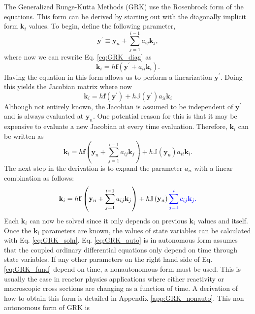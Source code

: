 \documentclass{ansconf}
\numberwithin{equation}{section}
\begin{document}
The Generalized Runge-Kutta Methods (GRK) use the Rosenbrock form of the equations. This form can be derived by starting out with the diagonally implicit form $\mathbf{k}_i$ values. To begin, define the following parameter,
\begin{equation}
\mathbf{y}^\prime \equiv \mathbf{y}_n + \sum_{j=1}^{i-1}a_{ij}\mathbf{k}_j,
\end{equation} 
where now we can rewrite Eq. \eqref{eq:GRK_diag} as
\begin{equation}
  \mathbf{k}_i = h\mathbf{f}\left(\mathbf{y}^\prime  + a_{ii}\mathbf{k}_i\right).
\end{equation}
Having the equation in this form allows us to perform a linearization $\mathbf{y}^\prime$. Doing this yields the Jacobian matrix where now
\begin{equation}
 \mathbf{k}_i = h\mathbf{f}\left(\mathbf{y}^\prime\right) + h\mathbb{J}\left(\mathbf{y}^\prime\right)a_{ii}\mathbf{k}_i
\end{equation}
Although not entirely known, the Jacobian is assumed to be independent of $\mathbf{y}^\prime$ and is always evaluated at $\mathbf{y}_n$. One potential reason for this is that it may be expensive to evaluate a new Jacobian at every time evaluation. Therefore, $\mathbf{k}_i$ can be written as
\begin{equation}
   \mathbf{k}_i = h\mathbf{f}\left(\mathbf{y}_n + \sum_{j=1}^{i-1}a_{ij}\mathbf{k}_j\right) + h\mathbb{J}\left(\mathbf{y}_n\right)a_{ii}\mathbf{k}_i.
\end{equation}
The next step in the derivation is to expand the parameter $a_{ii}$ with a linear combination as follows:
\begin{equation}\label{eq:GRK_auto}
     \mathbf{k}_i = h\mathbf{f}\left(\mathbf{y}_n + \sum_{j=1}^{i-1}a_{ij}\mathbf{k}_j\right) +     
     h\mathbb{J}\left(\mathbf{y}_n\right) \color{blue}\sum_{j=1}^{i}c_{ij}\mathbf{k}_j.
\end{equation}
Each $\mathbf{k}_i$ can now be solved since it only depends on previous $\mathbf{k}_i$ values and itself. Once the $\mathbf{k}_i$ parameters are known, the values of state variables can be calculated with Eq. \eqref{eq:GRK_soln}. Eq. \eqref{eq:GRK_auto} is in autonomous form assumes that the coupled ordinary differential equations only depend on time through state variables. If any other parameters on the right hand side of Eq. \eqref{eq:GRK_fund} depend on time, a nonautonomous form must be used. This is usually the case in reactor physics applications where either reactivity or macroscopic cross sections are changing as a function of time. A derivation of how to obtain this form is detailed in Appendix \ref{app:GRK_nonauto}. This non-autonomous form of GRK is
\end{document}
